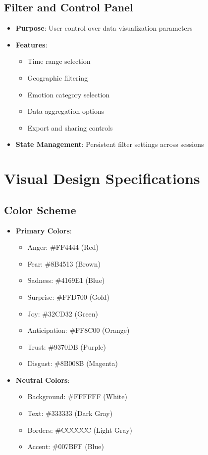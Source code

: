 \subsection{Filter and Control Panel}
\begin{itemize}
\item \textbf{Purpose}: User control over data visualization parameters
\item \textbf{Features}:
  \begin{itemize}
  \item Time range selection
  \item Geographic filtering
  \item Emotion category selection
  \item Data aggregation options
  \item Export and sharing controls
  \end{itemize}
\item \textbf{State Management}: Persistent filter settings across sessions
\end{itemize}


\section{Visual Design Specifications}

\subsection{Color Scheme}
\begin{itemize}
\item \textbf{Primary Colors}:
  \begin{itemize}
  \item Anger: \#FF4444 (Red)
  \item Fear: \#8B4513 (Brown)
  \item Sadness: \#4169E1 (Blue)
  \item Surprise: \#FFD700 (Gold)
  \item Joy: \#32CD32 (Green)
  \item Anticipation: \#FF8C00 (Orange)
  \item Trust: \#9370DB (Purple)
  \item Disgust: \#8B008B (Magenta)
  \end{itemize}
\item \textbf{Neutral Colors}:
  \begin{itemize}
  \item Background: \#FFFFFF (White)
  \item Text: \#333333 (Dark Gray)
  \item Borders: \#CCCCCC (Light Gray)
  \item Accent: \#007BFF (Blue)
  \end{itemize}
\end{itemize}

